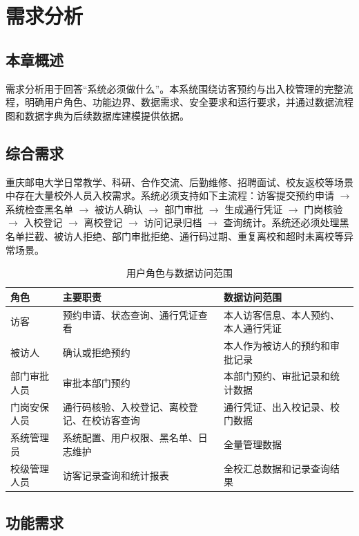 \section{需求分析}
\subsection{本章概述}
需求分析用于回答“系统必须做什么”。本系统围绕访客预约与出入校管理的完整流程，明确用户角色、功能边界、数据需求、安全要求和运行要求，并通过数据流程图和数据字典为后续数据库建模提供依据。

\subsection{综合需求}
重庆邮电大学日常教学、科研、合作交流、后勤维修、招聘面试、校友返校等场景中存在大量校外人员入校需求。系统必须支持如下主流程：访客提交预约申请 $\rightarrow$ 系统检查黑名单 $\rightarrow$ 被访人确认 $\rightarrow$ 部门审批 $\rightarrow$ 生成通行凭证 $\rightarrow$ 门岗核验 $\rightarrow$ 入校登记 $\rightarrow$ 离校登记 $\rightarrow$ 访问记录归档 $\rightarrow$ 查询统计。系统还必须处理黑名单拦截、被访人拒绝、部门审批拒绝、通行码过期、重复离校和超时未离校等异常场景。
\begin{longtable}{>{\raggedright\arraybackslash}p{}>{\raggedright\arraybackslash}p{}>{\raggedright\arraybackslash}p{}}
\caption{用户角色与数据访问范围}\\
\toprule
角色 & 主要职责 & 数据访问范围 \\
\midrule
访客 & 预约申请、状态查询、通行凭证查看 & 本人访客信息、本人预约、本人通行凭证 \\
被访人 & 确认或拒绝预约 & 本人作为被访人的预约和审批记录 \\
部门审批人员 & 审批本部门预约 & 本部门预约、审批记录和统计数据 \\
门岗安保人员 & 通行码核验、入校登记、离校登记、在校访客查询 & 通行凭证、出入校记录、校门数据 \\
系统管理员 & 系统配置、用户权限、黑名单、日志维护 & 全量管理数据 \\
校级管理人员 & 访客记录查询和统计报表 & 全校汇总数据和记录查询结果 \\
\bottomrule
\end{longtable}\subsection{功能需求}
